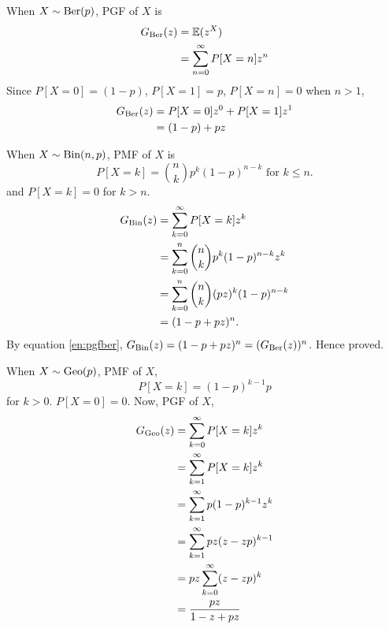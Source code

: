 \begin{solution}
	When $X\sim\text{Ber}(p)$, PGF of $X$ is
	\begin{align}
		G_{\text{Ber}}(z) & = \mathbb{E}(z^X)                     \\
		          & = \sum_{n=0}^\infty P[X=n]z^n
	\end{align}
	Since $P[X=0]=(1-p)$, $P[X=1] = p$, $P[X=n]=0$ when $n>1$,
	\begin{align}
		G_{\text{Ber}}(z) & = P[X=0]z^0 + P[X=1]z^1 \\
		          & = (1-p) + pz
		\label{en:pgfber}
	\end{align}

	When $X\sim\text{Bin}(n,p)$, PMF of $X$ is
	\begin{equation}
		P[X=k] = \binom{n}{k}p^k(1-p)^{n-k} \text{  for  } k\leq n.
	\end{equation}
	and $P[X=k]=0$ for $k>n$.
	\begin{align}
		G_{\text{Bin}}(z) & = \sum_{k=0}^\infty P[X=k]z^k                \\
		          & = \sum_{k=0}^n \binom{n}{k}p^k(1-p)^{n-k}z^k \\
		          & = \sum_{k=0}^n \binom{n}{k}(pz)^k(1-p)^{n-k} \\
		          & = (1-p + pz)^n.
		\label{en:pgfbin}
	\end{align}
	By equation \ref{en:pgfber}, $G_{\text{Bin}}(z) = (1-p + pz)^n =
		(G_{\text{Ber}}(z))^n$. Hence proved.

	When $X\sim\text{Geo}(p)$, PMF of $X$,
	\begin{equation}
		P[X=k] = (1-p)^{k-1}p
	\end{equation}
	for $k>0$. $P[X=0]=0$. Now, PGF of $X$,
	\begin{align}
		G_{\text{Geo}}(z) & = \sum_{k=0}^\infty P[X=k]z^k       \\
		          & = \sum_{k=1}^\infty P[X=k]z^k       \\
		          & = \sum_{k=1}^\infty p(1-p)^{k-1}z^k \\
		          & = \sum_{k=1}^\infty pz(z-zp)^{k-1}  \\
		          & = pz\sum_{k=0}^\infty (z-zp)^k      \\
		          & = \frac{pz}{1-z+pz}
	\end{align}


\end{solution}
